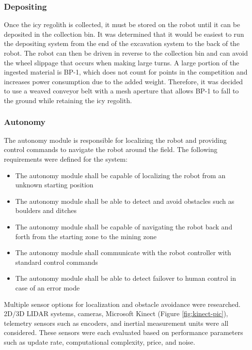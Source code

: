 \documentclass[class=article, crop=false]{standalone}
\begin{document}
	
	\subsubsection{Depositing}
	Once the icy regolith is collected, it must be stored on the robot until it can be deposited in the collection bin. It was determined that it would be easiest to run the depositing system from the end of the excavation system to the back of the robot. The robot can then be driven in reverse to the collection bin and can avoid the wheel slippage that occurs when making large turns. A large portion of the ingested material is BP-1, which does not count for points in the competition and increases power consumption due to the added weight. Therefore, it was decided to use a weaved conveyor belt with a mesh aperture that allows BP-1 to fall to the ground while retaining the icy regolith.
	
	
	\subsubsection{Autonomy}
	The autonomy module is responsible for localizing the robot and providing control commands to navigate the robot around the field. The following requirements were defined for the system:
	\begin{itemize}
	 \item The autonomy module shall be capable of localizing the robot from an unknown starting position
	 \item The autonomy module shall be able to detect and avoid obstacles such as boulders and ditches
	 \item The autonomy module shall be capable of navigating the robot back and forth from the starting zone to the mining zone
	 \item The autonomy module shall communicate with the robot controller with standard control commands
	 \item The autonomy module shall be able to detect failover to human control in case of an error mode
	\end{itemize}
	
	Multiple sensor options for localization and obstacle avoidance were researched. 2D/3D LIDAR systems, cameras, Microsoft Kinect (Figure \ref{fig:kinect-pic}), telemetry sensors such as encoders, and inertial measurement units were all considered. These sensors were each evaluated based on performance parameters such as update rate, computational complexity, price, and noise.
	
\end{document}
